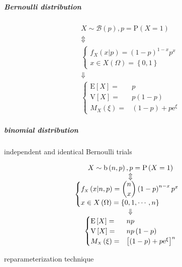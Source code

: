 \documentclass[
]{book}
\theoremstyle{definition}
\theoremstyle{definition}
\theoremstyle{definition}
\theoremstyle{definition}
\theoremstyle{remark}
\begin{document}
\subparagraph{Bernoulli distribution}\label{bernoulli-distribution}

\[
\begin{array}{c}
X\sim\mathcal{B}\left(p\right),p=\mathrm{P}\left(X=1\right)\\
\Updownarrow\\
\begin{cases}
f_{{\scriptscriptstyle X}}\left(x|p\right)=\left(1-p\right)^{1-x}p^{x}\\
x\in X\left(\Omega\right)=\left\{ 0,1\right\} 
\end{cases}\\
\Downarrow\\
\begin{cases}
\mathrm{E}\left[X\right]= & p\\
\mathrm{V}\left[X\right]= & p\left(1-p\right)\\
M_{{\scriptscriptstyle X}}\left(\xi\right)= & \left(1-p\right)+p\mathrm{e}^{\xi}
\end{cases}
\end{array}
\]

\subparagraph{binomial distribution}\label{binomial-distribution}

independent and identical Bernoulli trials

\[
\begin{array}{c}
X\sim\mathrm{b}\left(n,p\right),p=\mathrm{P}\left(X=1\right)\\
\Updownarrow\\
\begin{cases}
f_{{\scriptscriptstyle X}}\left(x|n,p\right)=\dbinom{n}{x}\left(1-p\right)^{n-x}p^{x}\\
x\in X\left(\Omega\right)=\left\{ 0,1,\cdots,n\right\} 
\end{cases}\\
\Downarrow\\
\begin{cases}
\mathrm{E}\left[X\right]= & np\\
\mathrm{V}\left[X\right]= & np\left(1-p\right)\\
M_{{\scriptscriptstyle X}}\left(\xi\right)= & \left[\left(1-p\right)+p\mathrm{e}^{\xi}\right]^{n}
\end{cases}
\end{array}
\]

reparameterization technique
\end{document}
